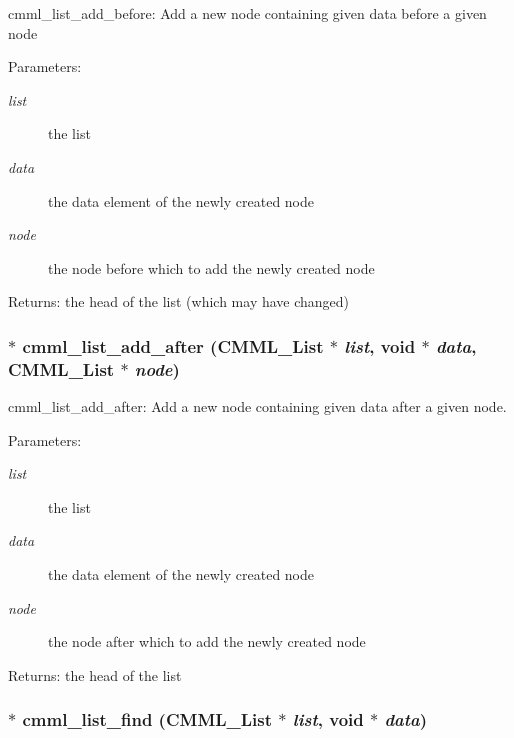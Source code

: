 cmml\_\-list\_\-add\_\-before: Add a new node containing given data before a given node

\begin{Desc}
\item[Parameters:]
\begin{description}
\item[{\em list}]the list \item[{\em data}]the data element of the newly created node \item[{\em node}]the node before which to add the newly created node\end{description}
\end{Desc}
\begin{Desc}
\item[Returns:]the head of the list (which may have changed) \end{Desc}
\subsubsection{$\ast$ cmml\_\-list\_\-add\_\-after ({\bf CMML\_\-List} $\ast$ {\em list}, void $\ast$ {\em data}, {\bf CMML\_\-List} $\ast$ {\em node})}\label{cmml_8h_a89}


cmml\_\-list\_\-add\_\-after: Add a new node containing given data after a given node.

\begin{Desc}
\item[Parameters:]
\begin{description}
\item[{\em list}]the list \item[{\em data}]the data element of the newly created node \item[{\em node}]the node after which to add the newly created node\end{description}
\end{Desc}
\begin{Desc}
\item[Returns:]the head of the list \end{Desc}
\subsubsection{$\ast$ cmml\_\-list\_\-find ({\bf CMML\_\-List} $\ast$ {\em list}, void $\ast$ {\em data})}\label{cmml_8h_a90}



